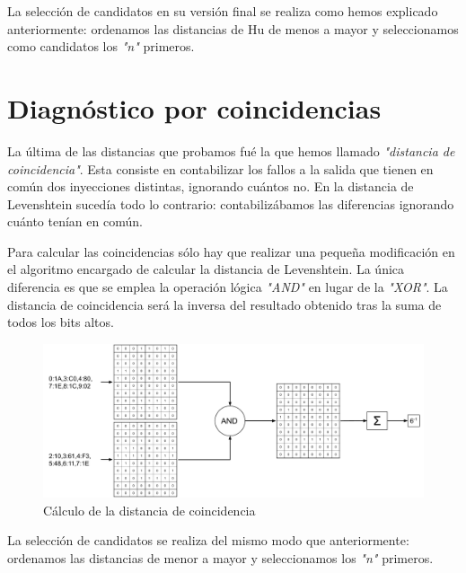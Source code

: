 La selección de candidatos en su versión final se realiza como hemos explicado
anteriormente: ordenamos las distancias de Hu de menos a mayor y seleccionamos
como candidatos los \textit{"n"} primeros.

\section{Diagnóstico por coincidencias}
\label{sec:CoincDist}
La última de las distancias que probamos fué la que hemos llamado
\textit{"distancia de coincidencia"}. Esta consiste en contabilizar los fallos a
la salida que tienen en común dos inyecciones distintas, ignorando cuántos no. En
la distancia de Levenshtein sucedía todo lo contrario: contabilizábamos las
diferencias ignorando cuánto tenían en común. 

Para calcular las coincidencias sólo hay que realizar una pequeña modificación en
el algoritmo encargado de calcular la distancia de Levenshtein. La única
diferencia es que se emplea la operación lógica \textit{"AND"} en lugar de la
\textit{"XOR"}. La distancia de coincidencia será la inversa del resultado
obtenido tras la suma de todos los bits altos.

\begin{figure}[htbp]
    \centering
    \includegraphics[width=0.95\linewidth]
    {TecnicasDeDiagnosticoAuxiliares/figuras/fig63.pdf}
    \caption{Cálculo de la distancia de coincidencia}
    \label{fig:CoincDist}
\end{figure}

La selección de candidatos se realiza del mismo modo que anteriormente: ordenamos
las distancias de menor a mayor y seleccionamos los \textit{"n"} primeros.


